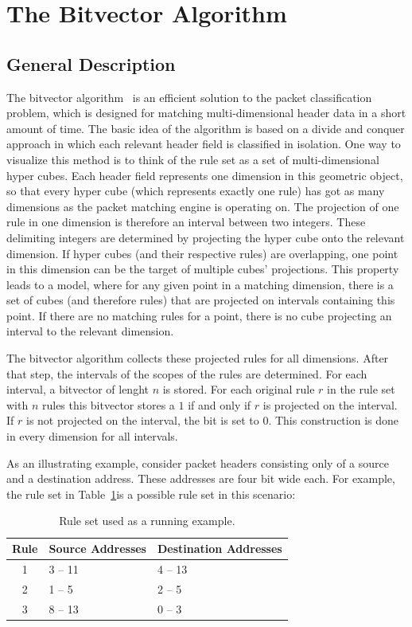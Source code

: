 \documentclass[conference]{IEEEtran}
\begin{document}
\section{The Bitvector Algorithm}
\subsection{General Description}
\label{sec:bv-general} %
The bitvector algorithm~\cite{bv} is an efficient solution to the packet 
classification problem, which is designed for matching multi-dimensional header data in a short amount of time.
The basic idea of the algorithm is based on a divide and conquer approach in 
which each relevant header field is classified in isolation.
One way to visualize this method is to think of the rule set as a set of multi-dimensional hyper cubes.
Each header field represents one dimension in this geometric object, so 
that every hyper cube (which represents exactly one rule) has got as many dimensions as the packet matching engine is operating on.
The projection of one rule in one dimension is therefore an interval between two integers.
These delimiting integers are determined by projecting the hyper cube onto the relevant dimension.
If hyper cubes (and their respective rules) are overlapping, one point in this dimension can be the target of multiple cubes' projections. 
This property leads to a model, where for any given point in a matching
dimension, there is a set of cubes (and therefore rules) that are projected on intervals containing this point.
If there are no matching rules for a point, there is no cube projecting an interval to the relevant dimension.

The bitvector algorithm collects these projected rules for all dimensions.
After that step, the intervals of the scopes of the rules are determined.
For each interval, a bitvector of lenght $n$ is stored.
For each original rule $r$ in the rule set with $n$ rules this bitvector 
stores a $1$ if and only if $r$ is projected on the interval.
If $r$ is not projected on the interval, the bit is set to $0$.
This construction is done in every dimension for all intervals.

As an illustrating example, consider packet headers consisting only of a source and a destination address.
These addresses are four bit wide each.
For example, the rule set in Table~\ref{tab:rules}is a possible rule set in this scenario:

\begin{table}
\centering
  \begin{tabularx}{0.48\textwidth}{c|X|X}
  Rule&Source Addresses&Destination Addresses\\
  \hline
  1&3 -- 11&4 -- 13\\
  2&1 -- 5&2 -- 5\\
  3&8 -- 13&0 -- 3\\
  \end{tabularx}
\caption{Rule set used as a running example.}
\label{tab:rules}
\end{table}
\end{document}

